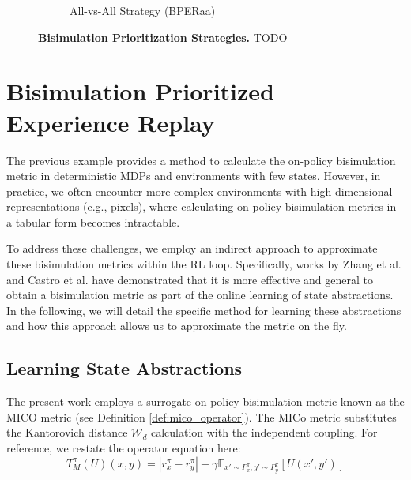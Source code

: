 \begin{figure}[H]
\begin{subfigure}{0.45\textwidth}
        \caption{All-vs-All Strategy (BPERaa)}
        \label{fig:all_vs_all}
    \end{subfigure}
    \caption[Bisimulation Prioritization Strategies]{\textbf{Bisimulation Prioritization Strategies.} TODO}
    \label{fig:bper_strategies}
\end{figure}

\section{Bisimulation Prioritized Experience Replay}

The previous example provides a method to calculate the on-policy bisimulation metric in deterministic MDPs and environments with few states. However, in practice, we often encounter more complex environments with high-dimensional representations (e.g., pixels), where calculating on-policy bisimulation metrics in a tabular form becomes intractable.

To address these challenges, we employ an indirect approach to approximate these bisimulation metrics within the RL loop. Specifically, works by Zhang et al. \cite{zhang2020learning} and Castro et al. \cite{castro2021mico} have demonstrated that it is more effective and general to obtain a bisimulation metric as part of the online learning of state abstractions. In the following, we will detail the specific method for learning these abstractions and how this approach allows us to approximate the metric on the fly.

\subsection{Learning State Abstractions}

The present work employs a surrogate on-policy bisimulation metric known as the MICO metric \cite{castro2021mico} (see Definition \ref{def:mico_operator}). The MICo metric substitutes the Kantorovich distance $\mathcal{W}_d$ calculation with the independent coupling. For reference, we restate the operator equation here:
$$
\label{eq:mico_operator}
    T^\pi_M(U)(x, y) = |r^\pi_{x} - r^\pi_{y}| + \gamma \mathbb{E}_{x'\sim P_x^\pi, y'\sim P_y^\pi}\left[U(x',y') \right]
$$


